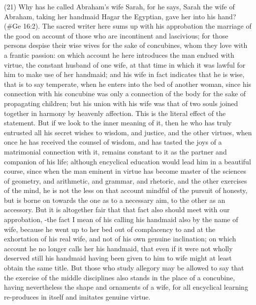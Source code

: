 (21) Why has he called Abraham's wife Sarah, for he says, Sarah the wife of Abraham, taking her
handmaid Hagar the Egyptian, gave her into his hand? (\#Ge 16:2). The sacred writer here
sums up with his approbation the marriage of the good on account of those who are incontinent
and lascivious; for those persons despise their wise wives for the sake of concubines, whom they
love with a frantic passion: on which account he here introduces the man endued with virtue, the
constant husband of one wife, at that time in which it was lawful for him to make use of her
handmaid; and his wife in fact indicates that he is wise, that is to say temperate, when he enters
into the bed of another woman, since his connection with his concubine was only a connection of
the body for the sake of propagating children; but his union with his wife was that of two souls
joined together in harmony by heavenly affection. This is the literal effect of the statement. But if
we look to the inner meaning of it, then he who has truly entrusted all his secret wishes to wisdom,
and justice, and the other virtues, when once he has received the counsel of wisdom, and has
tasted the joys of a matrimonial connection with it, remains constant to it as the partner and
companion of his life; although encyclical education would lead him in a beautiful course, since
when the man eminent in virtue has become master of the sciences of geometry, and arithmetic,
and grammar, and rhetoric, and the other exercises of the mind, he is not the less on that account
mindful of the pursuit of honesty, but is borne on towards the one as to a necessary aim, to the
other as an accessory. But it is altogether fair that that fact also should meet with our
approbation, -the fact I mean of his calling his handmaid also by the name of wife, because he went
up to her bed out of complacency to and at the exhortation of his real wife, and not of his own
genuine inclination; on which account he no longer calls her his handmaid, that even if it were not
wholly deserved still his handmaid having been given to him to wife might at least obtain the same
title. But those who study allegory may be allowed to say that the exercise of the middle disciplines
also stands in the place of a concubine, having nevertheless the shape and ornaments of a wife,
for all encyclical learning re-produces in itself and imitates genuine virtue.

